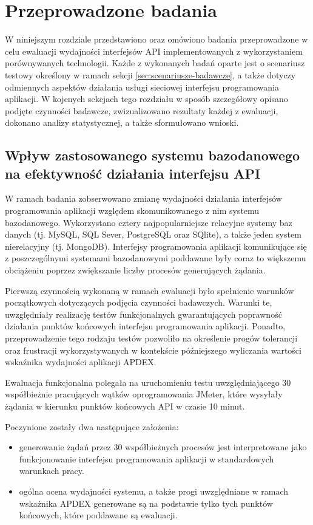 \chapter{Przeprowadzone badania}
W niniejszym rozdziale przedstawiono oraz omówiono badania przeprowadzone w celu ewaluacji wydajności interfejsów API implementowanych z wykorzystaniem porównywanych technologii. Każde z wykonanych badań oparte jest o scenariusz testowy określony w ramach sekcji \ref{sec:scenariusze-badawcze}, a także dotyczy odmiennych aspektów działania usługi sieciowej interfejsu programowania aplikacji. W kojenych sekcjach tego rozdziału w sposób szczegółowy opisano podjęte czynności badawcze, zwizualizowano rezultaty każdej z ewaluacji, dokonano analizy statystycznej, a także sformułowano wnioski.

\section{Wpływ zastosowanego systemu bazodanowego na efektywność działania interfejsu API}
\label{research:crud}
W ramach badania zobserwowano zmianę wydajności działania interfejsów programowania aplikacji względem skomunikowanego z nim systemu bazodanowego. Wykorzystano cztery najpopularniejsze relacyjne systemy baz danych (tj. MySQL, SQL Sever, PostgreSQL oraz SQlite), a także jeden system nierelacyjny (tj. MongoDB). Interfejsy programowania aplikacji komunikujące się z poszczególnymi systemami bazodanowymi poddawane były coraz to większemu obciążeniu poprzez zwiększanie liczby procesów generujących żądania.

Pierwszą czynnością wykonaną w ramach ewaluacji było spełnienie warunków początkowych dotyczących podjęcia czynności badawczych. Warunki te, uwzględniały realizację testów funkcjonalnych gwarantujących poprawność działania punktów końcowych interfejsu programowania aplikacji. Ponadto, przeprowadzenie tego rodzaju testów pozwoliło na określenie progów tolerancji oraz frustracji wykorzystywanych w kontekście późniejszego wyliczania wartości wskaźnika wydajności aplikacji APDEX.

Ewaluacja funkcjonalna polegała na uruchomieniu testu uwzględniającego 30 współbieżnie pracujących wątków oprogramowania JMeter, które wysyłały żądania w kierunku punktów końcowych API w czasie 10 minut.

Poczynione zostały dwa następujące założenia:
\begin{itemize}
    \item generowanie żądań przez 30 współbieżnych procesów jest interpretowane jako funkcjonowanie interfejsu programowania aplikacji w standardowych warunkach pracy.
    \item ogólna ocena wydajności systemu, a także progi uwzględniane w ramach wskaźnika APDEX generowane są na podstawie tylko tych punktów końcowych, które poddawane są ewaluacji.
\end{itemize}

